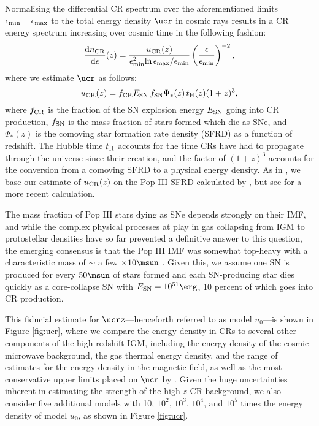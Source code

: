 Normalising the differential CR spectrum over the aforementioned limits $\epsilon_{\rm min} - \epsilon_{\rm max}$ to the total energy density $\ucr$ in cosmic rays results in a CR energy spectrum increasing over cosmic time in the following fashion:
 \begin{equation}
 \frac{{\rm d}n_{\rm \small CR}}{{\rm d}\epsilon}(z) = \frac{u_{\rm \small CR}(z)}{\epsilon_{\rm min}^2{\rm ln}\,\epsilon_{\rm max}{\large /}\epsilon_{\rm min}}  \left( \frac{\epsilon}{\epsilon_{\rm min}} \right)^{-2},
 \end{equation}
where we estimate $\ucr$ as follows:
\begin{equation}
u_{\rm \small CR}(z) = f_{\rm \small CR} E_{\rm \small SN}\, f_{\rm \small SN} \Psi_{*}(z)\, t_{\rm \small H}(z) (1+z)^3,
\end{equation}
where $f_{\rm \small CR}$ is the fraction of the SN explosion energy $E_{\rm \small SN}$ going into CR production, $f_{\rm \small SN}$ is the mass fraction of stars formed which die as SNe, and $\Psi_{*}(z)$ is the comoving star formation rate density (SFRD) as a function of redshift.  The Hubble time $t_{\rm \small H}$ accounts for the time CRs have had to propagate through the universe since their creation, and the factor of $(1+z)^3$ accounts for the conversion from a comoving SFRD to a physical energy density. As in \citet{Hummeletal2015}, we base our estimate of $u_{\rm \small CR}(z)$ on the Pop III SFRD calculated by \citet{GreifBromm2006}, but see \citet{Campisietal2011} for a more recent calculation. 

The mass fraction of Pop III stars dying as SNe depends strongly on their IMF, and while the complex physical processes at play in gas collapsing from IGM to protostellar densities have so far prevented a definitive answer to this question, the emerging consensus is that the Pop III IMF was somewhat top-heavy with a characteristic mass of $\sim$ a few $\times 10\msun$ \citep{Bromm2013}.  Given this, we assume one SN is produced for every $50\msun$ of stars formed and each SN-producing star dies quickly as a core-collapse SN with $E_{\rm \small SN} = 10^{51}\erg$, 10 percent of which goes into CR production.  

This fiducial estimate for $\ucrz$---henceforth referred to as model $u_0$---is shown in Figure \ref{fig:ucr}, where we compare the energy density in CRs to several other components of the high-redshift IGM, including the energy density of the cosmic microwave background, the gas thermal energy density, and the range of estimates for the energy density in the magnetic field, as well as the most conservative upper limits placed on $\ucr$ by \citet{RollindeVangioniOlive2006}. Given the huge uncertainties inherent in estimating the strength of the high-$z$ CR background, we also consider five additional models with 10, $10^2$, $10^3$, $10^4$, and $10^5$ times the energy density of model $u_0$, as shown in Figure \ref{fig:ucr}.
 